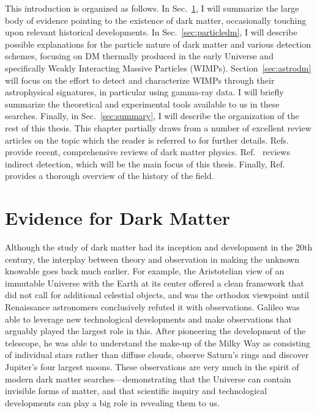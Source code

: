 This introduction is organized as follows. In Sec.~\ref{sec:evidence}, I will summarize the large body of evidence pointing to the existence of dark matter, occasionally touching upon relevant historical developments. In Sec.~\ref{sec:particledm}, I will describe possible explanations for the particle nature of dark matter and various detection schemes, focusing on DM thermally produced in the early Universe and specifically Weakly Interacting Massive Particles (WIMPs). Section~\ref{sec:astrodm} will focus on the effort to detect and characterize WIMPs through their astrophysical signatures, in particular using gamma-ray data. I will briefly summarize the theoretical and experimental tools available to us in these searches. Finally, in Sec.~\ref{sec:summary}, I will describe the organization of the rest of this thesis. This chapter partially draws from a number of excellent review articles on the topic which the reader is referred to for further details. Refs.~\cite{Lisanti:2016jxe,Plehn:2017fdg} provide recent, comprehensive reviews of dark matter physics. Ref.~\cite{Slatyer:2017sev} reviews indirect detection, which will be the main focus of this thesis. Finally, Ref.~\cite{Bertone:2016nfn} provides a thorough overview of the history of the field.


\section{Evidence for Dark Matter}
\label{sec:evidence}

Although the study of dark matter had its inception and development in the 20th century, the interplay between theory and observation in making the unknown knowable goes back much earlier. For example, the Aristotelian view of an immutable Universe with the Earth at its center offered a clean framework that did not call for additional celestial objects, and was the orthodox viewpoint until Renaissance astronomers conclusively refuted it with observations. Galileo was able to leverage new technological developments and make observations that arguably played the largest role in this. After pioneering the development of the telescope, he was able to understand the make-up of the Milky Way as consisting of individual stars rather than diffuse clouds, observe Saturn's rings and discover Jupiter's four largest moons. These observations are very much in the spirit of modern dark matter searches---demonstrating that the Universe can contain invisible forms of matter, and that scientific inquiry and technological developments can play a big role in revealing them to us.

